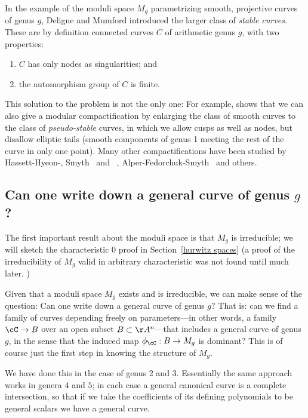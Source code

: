 In the example of the moduli space $M_g$ parametrizing smooth, projective curves of genus $g$, Deligne and Mumford introduced the larger class of \emph{stable curves}. These are by definition connected curves $C$ of arithmetic genus $g$, with two properties:

\begin{enumerate}
\item $C$ has only nodes as singularities; and
\item the automorphism group of $C$ is finite.
\end{enumerate}

This  solution to the problem is not the only one: For example, \cite{MR1106299} shows that we can also give a modular compactification by enlarging the class of smooth curves to the class of \emph{pseudo-stable} curves, in which we allow cusps as well as nodes, but disallow elliptic tails (smooth components of genus 1 meeting the rest of the curve in only one point). Many other compactifications have been studied by Hassett-Hyeon-\cite{MR2500894}, Smyth~\cite{MR2801404} and ~\cite{MR3044128}, Alper-Fedorchuk-Smyth~\cite{MR3020172} and others.

\subsection{Can one write down a general curve of genus $g$?}

The first important result about the moduli space is that $M_g$ is irreducible; we will sketch the characteristic 0 proof in Section~\ref{hurwitz spaces}  (a proof of the irreducibility of $M_g$ valid in arbitrary characteristic was not found until much later. )

Given that a moduli space $M_g$ exists and is irreducible, we can make sense of the question: Can one write down a general curve of genus $g$?
That is: can we find a family of curves depending freely on parameters---in other words, a family $\cC \to B$ over an open subset $B \subset \AA^n$---that includes a general curve of genus $g$, in the sense that the induced map $\phi_\cC : B \to M_g$ is dominant? This is of course just the first step in knowing the structure of $M_g$.

We have done this in the case of genus 2 and 3. Essentially
the same approach works in genera $4$ and $5$; in each case a general canonical curve is a complete intersection, so that if we take the coefficients of its defining polynomials to be general scalars we have a general curve.

